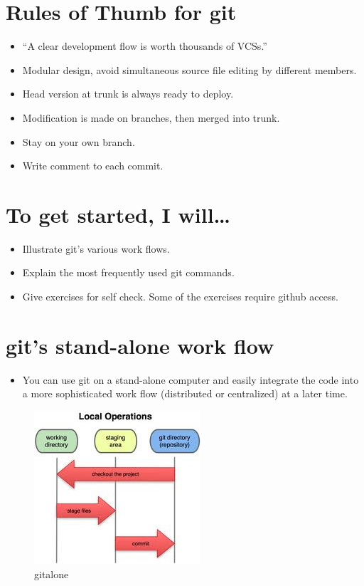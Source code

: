 \documentclass[]{article}
\makeatletter
\def\maxwidth{\ifdim\Gin@nat@width>\linewidth\linewidth
\else\Gin@nat@width\fi}
\let\Oldincludegraphics\includegraphics
\renewcommand{\includegraphics}[1]{\Oldincludegraphics[width=\maxwidth]{#1}}
\makeatother
\begin{document}
\section{Rules of Thumb for git}

\begin{itemize}
\item
  ``A clear development flow is worth thousands of VCSs.''
\item
  Modular design, avoid simultaneous source file editing by different
  members.
\item
  Head version at trunk is always ready to deploy.
\item
  Modification is made on branches, then merged into trunk.
\item
  Stay on your own branch.
\item
  Write comment to each commit.
\end{itemize}
\section{To get started, I will\ldots{}}

\begin{itemize}
\item
  Illustrate git's various work flows.
\item
  Explain the most frequently used git commands.
\item
  Give exercises for self check. Some of the exercises require github
  access.
\end{itemize}
\section{git's stand-alone work flow}

\begin{itemize}
\item
  You can use git on a stand-alone computer and easily integrate the
  code into a more sophisticated work flow (distributed or centralized)
  at a later time.
\end{itemize}
\begin{figure}[htbp]
\centering
\includegraphics{figures/gitstandalone.jpeg}
\caption{gitalone}
\end{figure}
\end{document}
